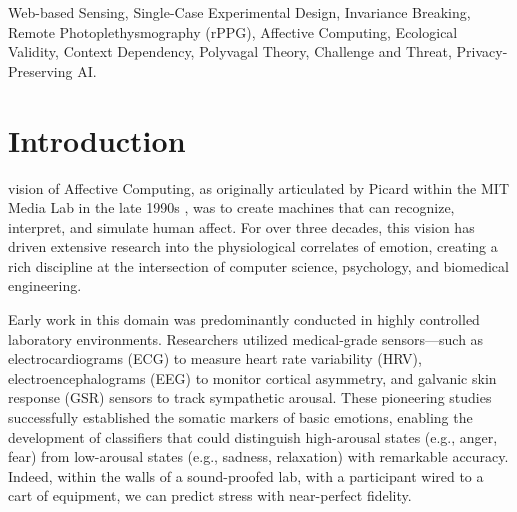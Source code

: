 \documentclass[journal]{IEEEtran}
\begin{document}
\begin{abstract}
\textbf{\textit{Conclusion}}: These findings provide empirical support for the "Safe Haven" hypothesis, suggesting that familiar, safe environments act as powerful moderators of the autonomic nervous system, effectively buffering the impact of cognitive stressors. We discuss the profound implications of this "Invariance Breaking" for the design of next-generation ubiquitous computing systems, arguing that future affective models must be dynamically parameterized by the user's environmental context to avoid catastrophic misinterpretation of physiological signals.
\end{abstract}

\begin{IEEEkeywords}
Web-based Sensing, Single-Case Experimental Design, Invariance Breaking, Remote Photoplethysmography (rPPG), Affective Computing, Ecological Validity, Context Dependency, Polyvagal Theory, Challenge and Threat, Privacy-Preserving AI.
\end{IEEEkeywords}

\section{Introduction}

 vision of Affective Computing, as originally articulated by Picard within the MIT Media Lab in the late 1990s \cite{picard_affective_computing}, was to create machines that can recognize, interpret, and simulate human affect. For over three decades, this vision has driven extensive research into the physiological correlates of emotion, creating a rich discipline at the intersection of computer science, psychology, and biomedical engineering.

Early work in this domain was predominantly conducted in highly controlled laboratory environments. Researchers utilized medical-grade sensors—such as electrocardiograms (ECG) to measure heart rate variability (HRV), electroencephalograms (EEG) to monitor cortical asymmetry, and galvanic skin response (GSR) sensors to track sympathetic arousal. These pioneering studies successfully established the somatic markers of basic emotions, enabling the development of classifiers that could distinguish high-arousal states (e.g., anger, fear) from low-arousal states (e.g., sadness, relaxation) with remarkable accuracy. Indeed, within the walls of a sound-proofed lab, with a participant wired to a cart of equipment, we can predict stress with near-perfect fidelity.
\end{document}
